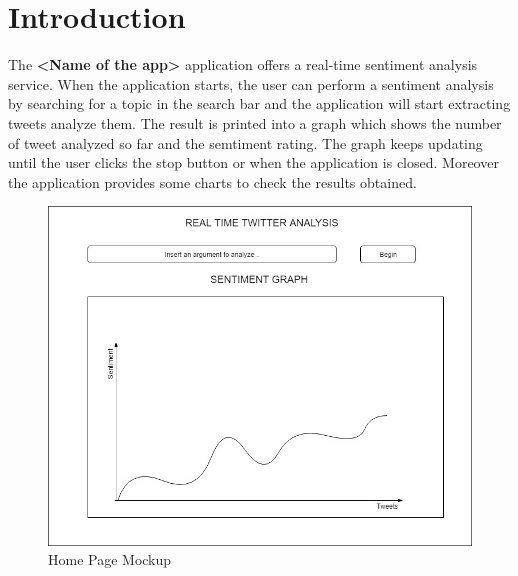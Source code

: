 \documentclass[a4paper, oneside]{article}
\begin{document}
\baselineskip 13pt

\begin{frontespizio} 
 \Preambolo{\renewcommand{\frontpretitlefont}{\fontsize{15}{12}\scshape}}
\Rientro {1cm}
 \Punteggiatura {}
\end{frontespizio}

\clearpage

	\tableofcontents\thispagestyle{empty}
	\clearpage


\section{Introduction}
The \textbf{<Name of the app>} application offers a real-time sentiment analysis service. When the application starts, the user can perform a sentiment analysis by searching for a topic in the search bar and the application will start extracting tweets analyze them.
The result is printed into a graph which shows the number of tweet analyzed so far and the semtiment rating. The graph keeps updating until the user clicks the stop button or when the application is closed. Moreover the application provides some charts to check the results obtained.
\vspace{5mm}
\begin{figure}[h]
\centering
\includegraphics[width=\textwidth]{./images/diagrams/HomeMockup} 
\caption{Home Page Mockup}
\label{fig:mockup}
\end{figure}
\end{document}
